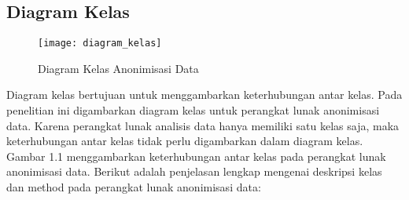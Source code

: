 \subsection{Diagram Kelas}
\begin{figure}[H]
	\centering
	\texttt{[image: diagram\_kelas]}
	\caption{Diagram Kelas Anonimisasi Data}
	\label{fig:diagram_kelas}
\end{figure}

Diagram kelas bertujuan untuk menggambarkan keterhubungan antar kelas. Pada penelitian ini digambarkan diagram kelas untuk perangkat lunak anonimisasi data. Karena perangkat lunak analisis data hanya memiliki satu kelas saja, maka keterhubungan antar kelas tidak perlu digambarkan dalam diagram kelas. Gambar 1.1 menggambarkan keterhubungan antar kelas pada perangkat lunak anonimisasi data. Berikut adalah penjelasan lengkap mengenai deskripsi kelas dan method pada perangkat lunak anonimisasi data:


